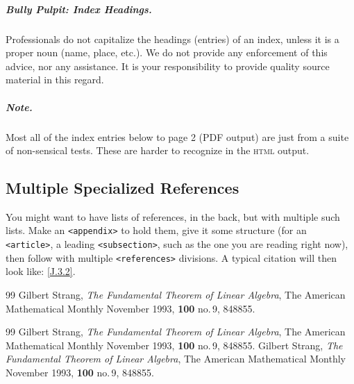 \documentclass{amsart}
\theoremstyle{plain}%
\theoremstyle{definition}%
\theoremstyle{remark}%
\newcommand{\xreffont}{\relax}
\newcommand{\mono}[1]{\texttt{#1}}
\newcommand{\initialism}[1]{\textsc{\MakeLowercase{#1}}}
\numberwithin{equation}{section}
\begin{document}
\begin{appendices}
\subparagraph*{Bully Pulpit: Index Headings.}\label{appendix-index-5}%
Professionals do not capitalize the headings (entries) of an index, unless it is a proper noun (name, place, etc.\@).  We do not provide any enforcement of this advice, nor any assistance.  It is your responsibility to provide quality source material in this regard.%
\subparagraph*{Note.}\label{appendix-index-6}%
Most all of the index entries below to page 2 (PDF output) are just from a suite of non-sensical tests.  These are harder to recognize in the \initialism{HTML} output.%
%
%
\typeout{************************************************}
\typeout{************************************************}
%
\label{appendix-multiple-references}%
%
%
\typeout{************************************************}
\typeout{************************************************}
%
\subsection{Multiple Specialized References}\label{appendix-multiple-references-2}%
You might want to have lists of references, in the back, but with multiple such lists.  Make an \mono{<appendix>} to hold them, give it some structure (for an \mono{<article>}, a leading \mono{<subsection>}, such as the one you are reading right now), then follow with multiple \mono{<references>} divisions.  A typical citation will then look like: \hyperlink{biblio-strang-article-tres}{[{\xreffont J.3.2}]}.%
%
%
\typeout{************************************************}
\typeout{************************************************}
%

\begin{thebibliography}{99}
\hypertarget{biblio-strang-article-uno}{}Gilbert Strang, \textit{The Fundamental Theorem of Linear Algebra}, The American Mathematical Monthly November 1993, \textbf{100} no.\@\,9, 848\textendash{}855.
\end{thebibliography}
%
%
\typeout{************************************************}
\typeout{************************************************}
%

\begin{thebibliography}{99}
\hypertarget{biblio-strang-article-dos}{}Gilbert Strang, \textit{The Fundamental Theorem of Linear Algebra}, The American Mathematical Monthly November 1993, \textbf{100} no.\@\,9, 848\textendash{}855.
\hypertarget{biblio-strang-article-tres}{}Gilbert Strang, \textit{The Fundamental Theorem of Linear Algebra}, The American Mathematical Monthly November 1993, \textbf{100} no.\@\,9, 848\textendash{}855.
\end{thebibliography}
\end{appendices}%
%
\end{document}
